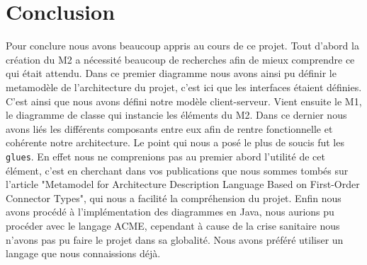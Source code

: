 \documentclass[11pt, a4paper, notitlepage]{article}
\newcommand\tab{\hspace*{10mm}}
\begin{document}
\section*{Conclusion}
\tab Pour conclure nous avons beaucoup appris au cours de ce projet. Tout d'abord la création du M2 a nécessité beaucoup de recherches afin de mieux comprendre ce qui était attendu. Dans ce premier diagramme nous avons ainsi pu définir le metamodèle de l'architecture du projet, c'est ici que les interfaces étaient définies. C'est ainsi que nous avons défini notre modèle client-serveur. Vient ensuite le M1, le diagramme de classe qui instancie les éléments du M2. Dans ce dernier nous avons liés les différents composants entre eux afin de rentre fonctionnelle et cohérente notre architecture. Le point qui nous a posé le plus de soucis fut les \verb"glues". En effet nous ne comprenions pas au premier abord l'utilité de cet élément, c'est en cherchant dans vos publications que nous sommes tombés sur l'article "Metamodel for Architecture Description Language Based on First-Order Connector Types", qui nous a facilité la compréhension du projet. Enfin nous avons procédé à l'implémentation des diagrammes en Java, nous aurions pu procéder avec le langage ACME, cependant à cause de la crise sanitaire nous n'avons pas pu faire le projet dans sa globalité. Nous avons préféré utiliser un langage que nous connaissions déjà.
\end{document}
